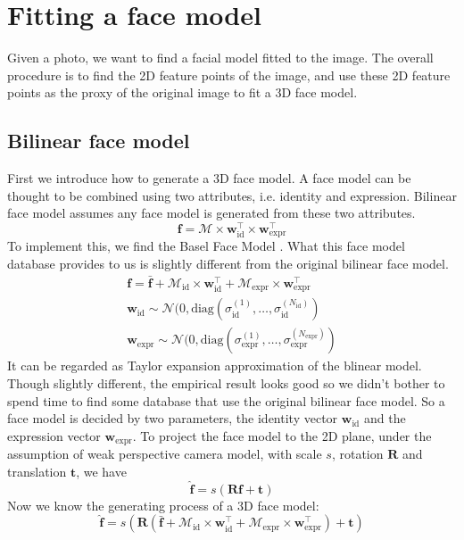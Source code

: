 
\section{Fitting a face model}
Given a photo, we want to find a facial model fitted to the image. The overall procedure is to find the 2D feature points of the image, and use these 2D feature points as the proxy of the original image to fit a 3D face model.

\subsection{Bilinear face model}
First we introduce how to generate a 3D face model. A face model can be thought to be combined using two attributes, i.e. identity and expression. Bilinear face model \cite{vlasic2005face} assumes any face model is generated from these two attributes. 
$$\mathbf{f} = \mathcal{M} \times \mathbf{w}_{\text{id}}^\top \times \mathbf{w}_{\text{expr}}^\top$$
To implement this, we find the Basel Face Model \cite{gerig2017morphable}. What this face model database provides to us is slightly different from the original bilinear face model. 
\begin{align*}
\mathbf{f} = \bar{\mathbf{f}} + \mathcal{M}_{\text{id}} \times \mathbf{w}_{\text{id}}^\top + \mathcal{M}_{\text{expr}}\times \mathbf{w}_{\text{expr}}^\top \\
\mathbf{w}_{\text{id}} \sim \mathcal{N}(0, \text{diag}(\sigma_{\text{id}}^{(1)}, \dots, \sigma_{\text{id}}^{(N_\text{id})}) \\ 
\mathbf{w}_{\text{expr}} \sim \mathcal{N}(0, \text{diag}(\sigma_{\text{expr}}^{(1)}, \dots, \sigma_{\text{expr}}^{(N_\text{expr})})
\end{align*}
It can be regarded as Taylor expansion approximation of the blinear model. Though slightly different, the empirical result looks good so we didn't bother to spend time to find some database that use the original bilinear face model.
So a face model is decided by two parameters, the identity vector $\mathbf{w}_{\text{id}}$ and the expression vector $\mathbf{w}_{\text{expr}}$. To project the face model to the 2D plane, under the assumption of weak perspective camera model, with scale $s$, rotation $\mathbf{R}$ and translation $\mathbf{t}$, we have 
$$\hat{\mathbf{f}} = s (\mathbf{R} \mathbf{f} + \mathbf{t})$$
Now we know the generating process of a 3D face model:
$$\hat{\mathbf{f}} = s (\mathbf{R} (\bar{\mathbf{f}} + \mathcal{M}_{\text{id}} \times \mathbf{w}_{\text{id}}^\top + \mathcal{M}_{\text{expr}}\times \mathbf{w}_{\text{expr}}^\top) + \mathbf{t})$$
